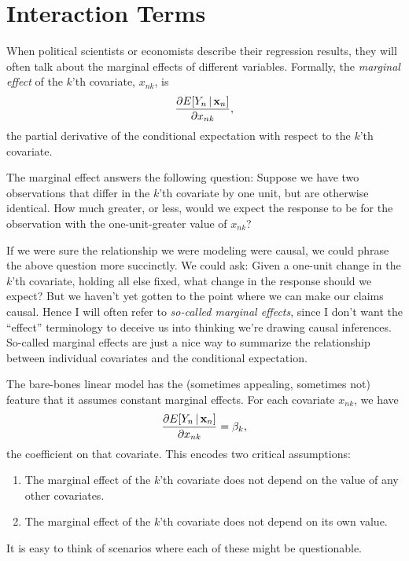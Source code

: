 \documentclass[12pt,oneside,openany]{book}
\begin{document}
\section{Interaction Terms}\label{interaction-terms}

When political scientists or economists describe their regression
results, they will often talk about the marginal effects of different
variables. Formally, the \emph{marginal effect} of the \(k\)'th
covariate, \(x_{nk}\), is \[
\frac{\partial{}E[Y_n \,|\, \mathbf{x}_n]}{\partial{}x_{nk}},
\] the partial derivative of the conditional expectation with respect to
the \(k\)'th covariate.

The marginal effect answers the following question: Suppose we have two
observations that differ in the \(k\)'th covariate by one unit, but are
otherwise identical. How much greater, or less, would we expect the
response to be for the observation with the one-unit-greater value of
\(x_{nk}\)?

If we were sure the relationship we were modeling were causal, we could
phrase the above question more succinctly. We could ask: Given a
one-unit change in the \(k\)'th covariate, holding all else fixed, what
change in the response should we expect? But we haven't yet gotten to
the point where we can make our claims causal. Hence I will often refer
to \emph{so-called marginal effects}, since I don't want the ``effect''
terminology to deceive us into thinking we're drawing causal inferences.
So-called marginal effects are just a nice way to summarize the
relationship between individual covariates and the conditional
expectation.

The bare-bones linear model has the (sometimes appealing, sometimes not)
feature that it assumes constant marginal effects. For each covariate
\(x_{nk}\), we have \[
\frac{\partial{}E[Y_n \,|\, \mathbf{x}_n]}{\partial{}x_{nk}} = \beta_k,
\] the coefficient on that covariate. This encodes two critical
assumptions:

\begin{enumerate}
\def\labelenumi{\arabic{enumi}.}
\item
  The marginal effect of the \(k\)'th covariate does not depend on the
  value of any other covariates.
\item
  The marginal effect of the \(k\)'th covariate does not depend on its
  own value.
\end{enumerate}

It is easy to think of scenarios where each of these might be
questionable.
\end{document}

